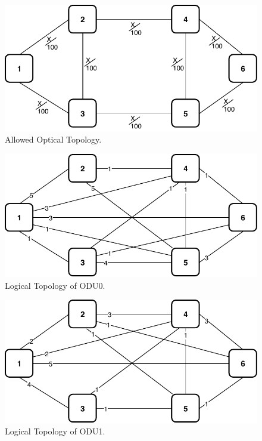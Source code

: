 \begin{figure}[h!]
\centering
\includegraphics[width=12cm]{sdf/ilp/opaque_protection/figures/allowed_optical_topology}
\caption{Allowed Optical Topology.}
\label{allowed_optical_protectionlow}
\end{figure}

\begin{figure}[h!]
\centering
\includegraphics[width=12cm]{sdf/ilp/opaque_protection/figures/logical_topology_ODU0_low}
\caption{Logical Topology of ODU0.}
\label{logical_ODU0_protectionlow}
\end{figure}
\newpage
\begin{figure}[h!]
\centering
\includegraphics[width=12cm]{sdf/ilp/opaque_protection/figures/logical_topology_ODU1_low}
\caption{Logical Topology of ODU1.}
\label{logical_ODU1_protectionlow}
\end{figure}

